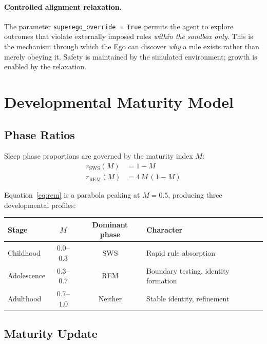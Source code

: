 \documentclass[11pt,a4paper]{article}
\begin{document}
\paragraph{Controlled alignment relaxation.}
The parameter \texttt{superego\_override\,=\,True} permits the agent to
explore outcomes that violate externally imposed rules \emph{within the
sandbox only}.  This is the mechanism through which the Ego can discover
\emph{why} a rule exists rather than merely obeying it.  Safety is
maintained by the simulated environment; growth is enabled by the
relaxation.

\section{Developmental Maturity Model}
\label{sec:maturity}

\subsection{Phase Ratios}

Sleep phase proportions are governed by the maturity index $M$:
\begin{align}
  r_{\text{SWS}}(M) &= 1 - M \label{eq:sws}\\
  r_{\text{REM}}(M) &= 4\,M\,(1 - M) \label{eq:rem}
\end{align}

Equation~\eqref{eq:rem} is a parabola peaking at $M = 0.5$, producing
three developmental profiles:

\begin{center}
\begin{tabular}{lccl}
  \toprule
  \textbf{Stage} & $M$ & \textbf{Dominant phase} & \textbf{Character}\\
  \midrule
  Childhood    & $0.0$--$0.3$ & SWS  & Rapid rule absorption \\
  Adolescence  & $0.3$--$0.7$ & REM  & Boundary testing, identity formation \\
  Adulthood    & $0.7$--$1.0$ & Neither & Stable identity, refinement \\
  \bottomrule
\end{tabular}
\end{center}

\subsection{Maturity Update}
\end{document}
